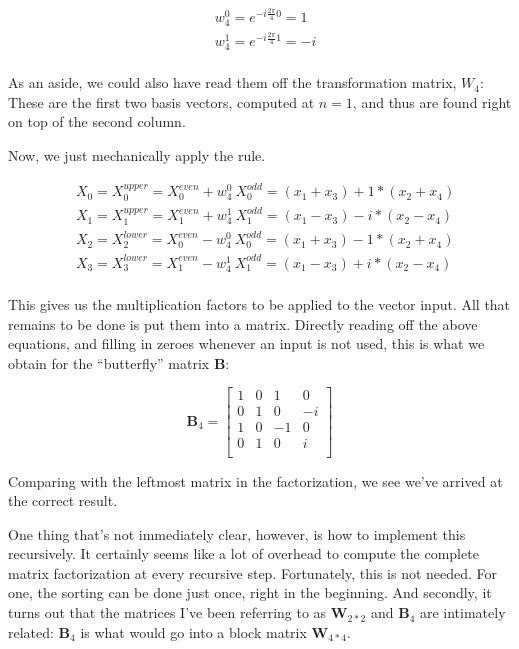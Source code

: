 \documentclass[
  letterpaper,
]{krantz}
\begin{document}
\[
\begin{aligned}
&w^0_4 = e^{-i\frac{2 \pi}{4}0} = 1\\
&w^1_4 = e^{-i\frac{2 \pi}{4}1} = -i\\
\end{aligned}
\]

As an aside, we could also have read them off the transformation matrix,
\(W_4\): These are the first two basis vectors, computed at \(n=1\), and
thus are found right on top of the second column.

Now, we just mechanically apply the rule.

\[
\begin{aligned}
&X_0 = X^{upper}_0 = X^{even}_0 +  w^0_4 \ X^{odd}_0 = (x_1 + x_3) + 1 * (x_2 + x_4)  \\
&X_1 = X^{upper}_1 = X^{even}_1 +  w^1_4 \ X^{odd}_1 = (x_1 - x_3) - i * (x_2 - x_4)  \\
&X_2 = X^{lower}_2 = X^{even}_0 -  w^0_4 \ X^{odd}_0 = (x_1 + x_3) - 1 * (x_2 + x_4)  \\
&X_3 = X^{lower}_3 = X^{even}_1 -  w^1_4 \ X^{odd}_1 = (x_1 - x_3) + i * (x_2 - x_4)  \\
\end{aligned}
\]

This gives us the multiplication factors to be applied to the vector
input. All that remains to be done is put them into a matrix. Directly
reading off the above equations, and filling in zeroes whenever an input
is not used, this is what we obtain for the ``butterfly'' matrix
\(\mathbf{B}\):

\[
\mathbf{B}_4
=
\begin{bmatrix}
1 &   0  & 1 &  0\\
0 &   1  & 0 &  -i\\
1 &   0  & -1 &  0\\
0 &   1  & 0 &  i\\
\end{bmatrix}
\]

Comparing with the leftmost matrix in the factorization, we see we've
arrived at the correct result.

One thing that's not immediately clear, however, is how to implement
this recursively. It certainly seems like a lot of overhead to compute
the complete matrix factorization at every recursive step. Fortunately,
this is not needed. For one, the sorting can be done just once, right in
the beginning. And secondly, it turns out that the matrices I've been
referring to as \(\mathbf{W}_{2*2}\) and \(\mathbf{B}_{4}\) are
intimately related: \(\mathbf{B}_{4}\) is what would go into a block
matrix \(\mathbf{W}_{4*4}\).
\end{document}
